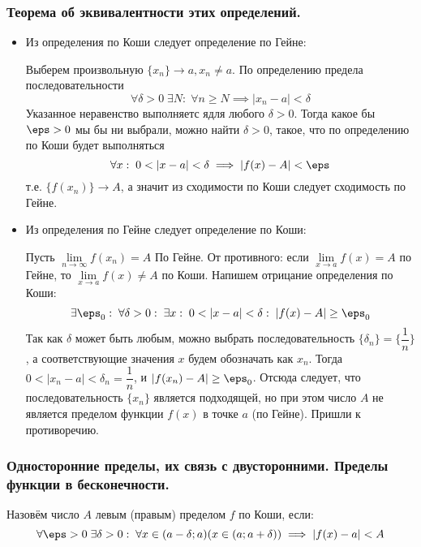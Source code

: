 \documentclass[12pt, a4paper]{article}
\begin{document}
	\subsubsection{Теорема об эквивалентности этих определений.} 
	\begin{itemize}
		\item
		Из определения по Коши следует определение по Гейне:

		Выберем произвольную $\{x_n\} \to a, x_n \neq a$. По определению предела последовательности 
		\begin{equation*}
			\forall \delta > 0 \; \exists N: \; \forall n \geq N \implies |x_n - a| < \delta
		\end{equation*}
		Указанное неравенство выполняетс ядля любого $\delta > 0$. Тогда какое бы $\eps > 0$ мы бы ни выбрали, можно найти $\delta > 0$, такое, что по определению по Коши будет выполняться
		\begin{equation*}
			\forall x: \; 0 < |x - a| < \delta \implies |f(x) - A| < \eps
		\end{equation*}
		т.е. $\{f(x_n)\} \to A$, а значит из сходимости по Коши следует сходимость по Гейне.

		\item
		Из определения по Гейне следует определение по Коши:

		Пусть $\lim\limits_{n \to \infty} f(x_n) = A$ По Гейне. От противного: если $\lim\limits_{x \to a} f(x) = A$ по Гейне, то $\lim\limits_{x \to a} f(x) \neq A$ по Коши. Напишем отрицание определения по Коши:
		\begin{equation*}
			\exists \eps_0: \; \forall \delta > 0: \; \exists x: \; 0 < |x - a| < \delta: \; |f(x) - A| \geq \eps_0
		\end{equation*}
		Так как $\delta$ может быть любым, можно выбрать последовательность $\{\delta_n\} = \{\dfrac{1}{n}\}$, а соответствующие значения $x$ будем обозначать как $x_n$. Тогда $0 < |x_n - a| < \delta_n = \dfrac{1}{n}$, и $|f(x_n) - A| \geq \eps_0$. Отсюда следует, что последовательность $\{x_n\}$ является подходящей, но при этом число $A$ не является пределом функции $f(x)$ в точке $a$ (по Гейне). Пришли к противоречию.
	\end{itemize}

	\subsubsection{Односторонние пределы, их связь с двусторонними. Пределы функции в бесконечности.}
	Назовём число $A$ левым (правым) пределом $f$ по Коши, если:
	\begin{equation*}
		\forall \eps > 0 \; \exists \delta > 0: \; \forall x \in (a - \delta; a) (x \in (a; a + \delta)) \implies |f(x) - a| < A
	\end{equation*}
\end{document}
